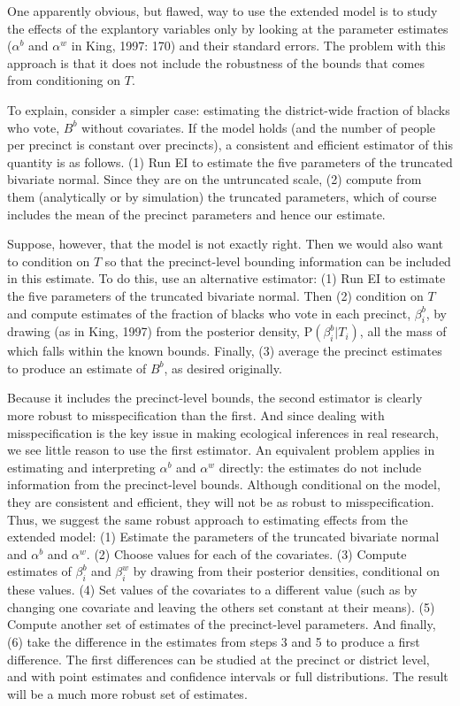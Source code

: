 \documentclass[11pt,titlepage]{article}
\renewcommand{\P}{\text{P}}
\begin{document}
One apparently obvious, but flawed, way to use the extended model is
to study the effects of the explantory variables only by looking at
the parameter estimates ($\alpha^b$ and $\alpha^w$ in King, 1997: 170)
and their standard errors.  The problem with this approach is that it
does not include the robustness of the bounds that comes from
conditioning on $T$.  

To explain, consider a simpler case: estimating the district-wide
fraction of blacks who vote, $B^b$ without covariates.  If the model
holds (and the number of people per precinct is constant over
precincts), a consistent and efficient estimator of this quantity is
as follows.  (1) Run EI to estimate the five parameters of the
truncated bivariate normal.  Since they are on the untruncated scale,
(2) compute from them (analytically or by simulation) the truncated
parameters, which of course includes the mean of the precinct
parameters and hence our estimate.

Suppose, however, that the model is not exactly right.  Then we would
also want to condition on $T$ so that the precinct-level bounding
information can be included in this estimate.  To do this, use an
alternative estimator: (1) Run EI to estimate the five parameters of
the truncated bivariate normal.  Then (2) condition on $T$ and compute
estimates of the fraction of blacks who vote in each precinct,
$\beta_i^b$, by drawing (as in King, 1997) from the posterior density,
$\P(\beta_i^b|T_i)$, all the mass of which falls within the known
bounds.  Finally, (3) average the precinct estimates to produce an
estimate of $B^b$, as desired originally.

Because it includes the precinct-level bounds, the second estimator is
clearly more robust to misspecification than the first.  And since
dealing with misspecification is the key issue in making ecological
inferences in real research, we see little reason to use the first
estimator.  An equivalent problem applies in estimating and
interpreting $\alpha^b$ and $\alpha^w$ directly: the estimates do not
include information from the precinct-level bounds.  Although
conditional on the model, they are consistent and efficient, they will
not be as robust to misspecification.  Thus, we suggest the same
robust approach to estimating effects from the extended model: (1)
Estimate the parameters of the truncated bivariate normal and
$\alpha^b$ and $\alpha^w$.  (2) Choose values for each of the
covariates. (3) Compute estimates of $\beta_i^b$ and $\beta_i^w$ by
drawing from their posterior densities, conditional on these values.
(4) Set values of the covariates to a different value (such as by
changing one covariate and leaving the others set constant at their
means). (5) Compute another set of estimates of the precinct-level
parameters.  And finally, (6) take the difference in the estimates
from steps 3 and 5 to produce a first difference.  The first
differences can be studied at the precinct or district level, and with
point estimates and confidence intervals or full distributions.  The
result will be a much more robust set of estimates.
\end{document}
